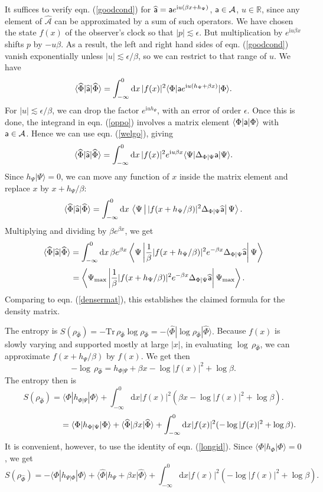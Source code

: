 \documentclass[11pt,a4paper]{article}
\def\a{{\sf a}}
\def\max{{\mathrm{max}}}
\def\be{\begin{equation}}
\def\ee{\end{equation}}
\def\h{\widehat}
\def\A{{\mathcal A}}
\def\d{{\mathrm d}}
\def\R{{\mathbb R}}
\def\h{\widehat}
\def\la{\langle}
\def\ra{\rangle}
\def\i{{\mathrm i}}
\def\Tr{{\mathrm{Tr}}}
\begin{document}
It suffices to verify eqn. (\ref{goodcond}) for $\h\a=\a e^{\i u(\beta x+h_\Psi)}$, $\a\in\A$, $u\in \R$, 
since any element of $\h\A$ can be approximated by a sum of such operators.   We have chosen
the state $f(x)$ of the observer's clock so that $|p|\lesssim \epsilon$.   But multiplication by $e^{\i u \beta x}$ shifts $p$ by $-u\beta$.   As a result,
the left and right hand sides of eqn. (\ref{goodcond}) vanish exponentially unless $|u|\lesssim \epsilon/\beta$, so we can restrict to that range of $u$.
We have
\be\label{oppo}\la\h\Phi|\h\a|\h\Phi\ra= \int_{-\infty}^0 \d x \,|f(x)|^2 \la\Phi|\a e^{\i u(h_\Psi+\beta x)} |\Phi\ra.\ee
For $|u|\lesssim \epsilon/\beta$, we can drop the factor $e^{\i u h_\Psi}$, with an error of order $\epsilon$.
Once this is done, the integrand in eqn. (\ref{oppo}) involves a matrix element $\la\Phi|\a|\Phi\ra$ with $\a\in \A$.
Hence we can use eqn. (\ref{welgo}), giving
\be\label{noppo}\la\h\Phi|\h\a|\h\Phi\ra= \int_{-\infty}^0 \d x \,|f(x)|^2 e^{\i u \beta x} \la\Psi |\Delta_{\Phi|\Psi} \a |\Psi\ra.\ee
Since $h_\Psi|\Psi\ra=0$, we can move any function of $x$ inside the matrix element and replace $x$ by $x+h_\Psi/\beta$:
\be\label{zoppo} \la\h\Phi|\h\a|\h\Phi\ra = \int_{-\infty}^0 \d x \,  \left\la\Psi \left|\,| f(x+h_\Psi/\beta)|^2 \Delta_{\Phi|\Psi} \h\a \right|\Psi\right\ra.\ee
Multiplying and dividing by $\beta e^{\beta x}$, we get 
\be\label{twofo}  \la\h\Phi|\h\a|\h\Phi\ra
=\int_{-\infty}^0\d x\,\beta e^{\beta x} \left\la\Psi \left|\frac{1}{\beta} |f(x+h_\Psi/\beta)|^2 e^{-\beta  x}\Delta_{\Phi|\Psi} \h\a\right |\Psi\right\ra \ee
 \be\notag~~~~=\left\la\Psi_\max\left| \frac{1}{\beta}  |f(x+h_\Psi/\beta)|^2 e^{-\beta  x}\Delta_{\Phi|\Psi}\h\a \right|\Psi_\max\right\ra.\ee
 Comparing to eqn. (\ref{densermat}),  this establishes the claimed formula for the density matrix.
 
 The entropy is $S(\rho_{\h\Phi}) =-\Tr\,\rho_{\h\Phi}\log \rho_{\h\Phi}=-\la\h\Phi|\log\rho_{\h\Phi}|\h\Phi\ra. $   Because $f(x)$ is slowly varying and supported
 mostly at large $|x|$, in evaluating $\log \,\rho_{\h\Phi}$, we can approximate $f(x+h_\Psi/\beta)$ by $f(x)$.   We get then 
 \be\label{logform}-\log \,\rho_{\h\Phi}= h_{\Phi|\Psi} +\beta x - \log |f(x)|^2 +\log \beta.\ee
 The entropy then is 
 \be\label{entans} S(\rho_{\h\Phi})=\la\Phi|h_{\Phi|\Psi}|\Phi\ra+\int_{-\infty}^0\d x |f(x)|^2 (\beta x-\log |f(x)|^2 +\log \beta).\ee
 \be\notag   ~~~~~~~~~~~~~~~~~~~=\la\Phi|h_{\Phi|\Psi}|\Phi\ra +\la \h\Phi|\beta x|\h\Phi\ra +\int_{-\infty}^0\d x |f(x)|^2(-\log |f(x)|^2+\log\beta).\ee
 It is convenient, however, to use the identity of eqn. (\ref{longid}).   Since $\la\Phi|h_\Phi|\Phi\ra=0$, we get
\be\label{betterid} S(\rho_{\h\Phi}) =-\la\Phi|h_{\Psi|\Phi}|\Phi\ra +\la \h\Phi|h_\Psi+\beta x|\h\Phi\ra +\int_{-\infty}^0\d x |f(x)|^2(-\log |f(x)|^2+\log\beta).\ee
 
\end{document}
